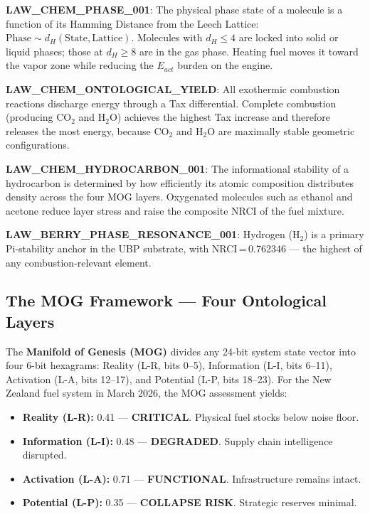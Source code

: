 \documentclass[12pt,a4paper]{article}
\begin{document}
\textbf{LAW\_CHEM\_PHASE\_001}: The physical phase state of a molecule is a function
of its Hamming Distance from the Leech Lattice: $\text{Phase} \sim d_H(\text{State},
\text{Lattice})$. Molecules with $d_H \leq 4$ are locked into solid or liquid phases;
those at $d_H \geq 8$ are in the gas phase. Heating fuel moves it toward the
vapor zone while reducing the $E_{act}$ burden on the engine.

\textbf{LAW\_CHEM\_ONTOLOGICAL\_YIELD}: All exothermic combustion reactions discharge
energy through a Tax differential. Complete combustion (producing CO$_2$ and H$_2$O)
achieves the highest Tax increase and therefore releases the most energy, because
CO$_2$ and H$_2$O are maximally stable geometric configurations.

\textbf{LAW\_CHEM\_HYDROCARBON\_001}: The informational stability of a hydrocarbon is
determined by how efficiently its atomic composition distributes density across the
four MOG layers. Oxygenated molecules such as ethanol and acetone reduce layer stress
and raise the composite NRCI of the fuel mixture.

\textbf{LAW\_BERRY\_PHASE\_RESONANCE\_001}: Hydrogen (H$_2$) is a primary Pi-stability
anchor in the UBP substrate, with NRCI\,=\,0.762346 --- the highest of any
combustion-relevant element.

\subsection{The MOG Framework --- Four Ontological Layers}

The \textbf{Manifold of Genesis (MOG)} divides any 24-bit system state vector into four
6-bit hexagrams: Reality (L-R, bits 0--5), Information (L-I, bits 6--11), Activation
(L-A, bits 12--17), and Potential (L-P, bits 18--23). For the New Zealand fuel system
in March 2026, the MOG assessment yields:

\begin{itemize}
  \item \textbf{Reality (L-R):} 0.41 --- \textbf{CRITICAL}. Physical fuel stocks below noise floor.
  \item \textbf{Information (L-I):} 0.48 --- \textbf{DEGRADED}. Supply chain intelligence disrupted.
  \item \textbf{Activation (L-A):} 0.71 --- \textbf{FUNCTIONAL}. Infrastructure remains intact.
  \item \textbf{Potential (L-P):} 0.35 --- \textbf{COLLAPSE RISK}. Strategic reserves minimal.
\end{itemize}
\end{document}
